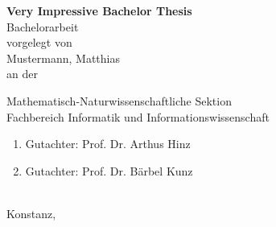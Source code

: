 
\newcommand{\MyTitle}{Very Impressive Bachelor Thesis}
\newcommand{\MyThesisType}{Bachelorarbeit}
\newcommand{\MyAuthor}{Mustermann, Matthias}

\newcommand{\MySektion}{Mathematisch-Naturwissenschaftliche Sektion}
\newcommand{\MyDepartement}{Fachbereich Informatik und Informationswissenschaft}

\newcommand{\MyCorrectorA}{Prof. Dr. Arthus Hinz}
\newcommand{\MyCorrectorB}{Prof. Dr. B\"arbel Kunz}

\begin{titlepage}
\pagestyle{empty}
\begin{center}

{\Huge \textbf{\MyTitle}} \\[2cm]

{\Large \MyThesisType} \\[1cm]

{\Large vorgelegt von \\[.3cm]
\MyAuthor} \\[1cm]

{\Large an der}


{\Large \MySektion}\\[1cm]

{\Large \MyDepartement}\\[1cm]

{\Large
\begin{enumerate}
    \item Gutachter: \MyCorrectorA
    \item Gutachter: \MyCorrectorB
\end{enumerate}
} \ \\[1cm]

{\Large Konstanz, \the\year}

\end{center}

\cleardoublepage

\pagestyle{plain}
\setcounter{page}{1}
\end{titlepage}
